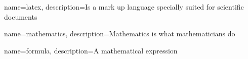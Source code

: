 %
%


{
	name=latex,
	description={Is a mark up language specially suited for 
		scientific documents}
}

{
	name=mathematics,
	description={Mathematics is what mathematicians do}
}

{
	name=formula,
	description={A mathematical expression}
}





